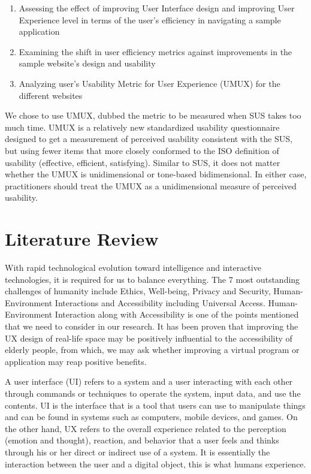 \documentclass[conference]{IEEEtran}
\begin{document}
\begin{enumerate}
    \item Assessing the effect of improving User Interface design and improving User Experience level in terms of the user's efficiency in navigating a sample application
    \item Examining the shift in user efficiency metrics against improvements in the sample website's design and usability
    \item Analyzing user's Usability Metric for User Experience (UMUX) for the different websites
\end{enumerate}


We chose to use UMUX, dubbed the metric to be measured when SUS takes too much time\cite{Lewis2013UMUXLITEWT}. UMUX is a relatively new standardized usability questionnaire designed to get a measurement of perceived usability consistent with the SUS\cite{Berkman2016ReassessingTU, Lewis2019MeasuringPU}, but using fewer items that more closely conformed to the ISO definition of usability (effective, efficient, satisfying). Similar to SUS, it does not matter whether the UMUX is unidimensional or tone-based bidimensional\cite{Lewis2018MeasuringPU}. In either case, practitioners should treat the UMUX as a unidimensional measure of perceived usability\cite{Lewis2018MeasuringPU}.

\section{Literature Review}

With rapid technological evolution toward intelligence and interactive technologies, it is required for us to balance everything. The 7 most outstanding challenges of humanity include Ethics, Well-being, Privacy and Security, Human-Environment Interactions and Accessibility including Universal Access\cite{Stephanidis2019SevenHG}. Human-Environment Interaction along with Accessibility is one of the points mentioned that we need to consider in our research. It has been proven that improving the UX design of real-life space may be positively influential to the accessibility of elderly people\cite{Yoo2021TheEO}, from which, we may ask whether improving a virtual program or application may reap positive benefits.

A user interface (UI) refers to a system and a user interacting with each other through commands or techniques to operate the system, input data, and use the contents\cite{Jooh}. UI is the interface that is a tool that users can use to manipulate things\cite{Roth2017UserIA} and can be found in systems such as computers, mobile devices, and games\cite{Jooh}. On the other hand, UX refers to the overall experience related to the perception (emotion and thought), reaction, and behavior that a user feels and thinks through his or her direct or indirect use of a system\cite{Jooh}. It is essentially the interaction between the user and a digital object, this is what humans experience\cite{Roth2017UserIA}.
\end{document}
